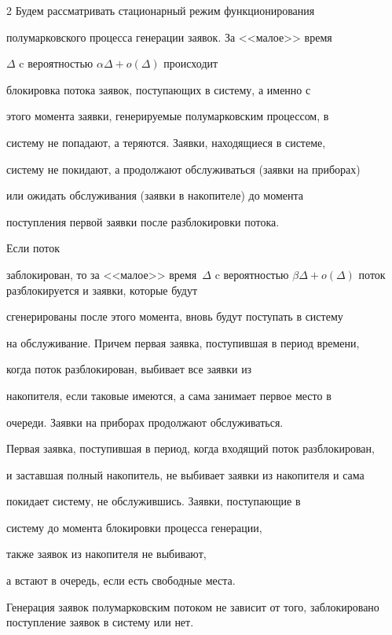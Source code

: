 \begin{multicols}{2}
Будем рассматривать стационарный режим функционирования


полумарковского процесса генерации заявок. За <<малое>> время


$\Delta$ c вероятностью $\alpha \Delta+o(\Delta)$ происходит


блокировка потока заявок, поступающих в систему, а именно с


этого момента заявки, генерируемые полумарковским процессом, в


систему не попадают, а теряются. Заявки, находящиеся в системе,


систему не покидают, а продолжают обслуживаться (заявки на приборах)


или ожидать обслуживания (заявки в накопителе) до момента


поступления первой заявки после разблокировки потока.





Если поток


заблокирован, то за <<малое>> время~$\Delta$ c вероятностью $\beta


\Delta+o(\Delta)$ поток разблокируется и заявки, которые будут


сгенерированы после этого момента, вновь будут поступать в систему


на обслуживание. Причем первая заявка, поступившая в период времени,


когда поток разблокирован, выбивает все заявки из


накопителя, если таковые имеются, а сама занимает первое место в


очереди. Заявки на приборах продолжают обслуживаться.


Первая заявка, поступившая в период, когда входящий поток разблокирован,


и заставшая полный накопитель, не выбивает заявки из накопителя и сама


покидает систему, не обслужившись. Заявки, поступающие в


систему до момента блокировки процесса генерации,


также заявок из накопителя не выбивают,


а встают в очередь, если есть свободные места.





Генерация заявок полумарковским потоком не зависит от того, заблокировано поступление заявок в систему или нет.






\end{multicols}
